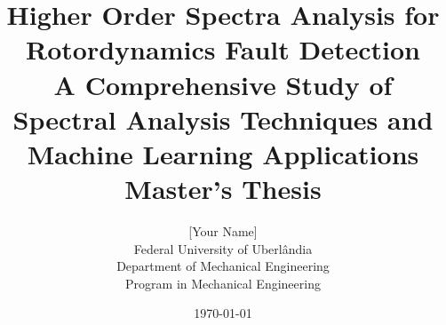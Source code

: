 \documentclass[12pt,a4paper,twoside]{report}
\title{
    \textbf{Higher Order Spectra Analysis for Rotordynamics Fault Detection}\\[0.5cm]
    \large{A Comprehensive Study of Spectral Analysis Techniques and Machine Learning Applications}\\[0.3cm]
    \normalsize{Master's Thesis}
}
\author{
    [Your Name]\\
    \small{Federal University of Uberlândia}\\
    \small{Department of Mechanical Engineering}\\
    \small{Program in Mechanical Engineering}
}
\date{\today}
\begin{document}
\maketitle



\tableofcontents

\listoffigures

\listoftables

\listofalgorithms





















\appendix








\end{document}
